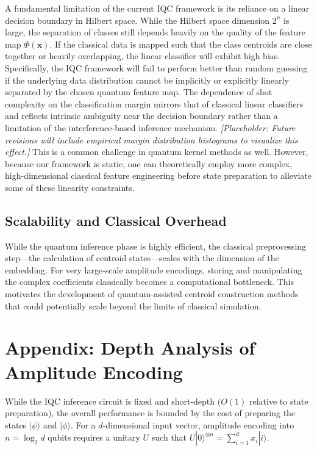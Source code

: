 \documentclass[conference]{IEEEtran}
\begin{document}
A fundamental limitation of the current IQC framework is its reliance on a linear decision boundary in Hilbert space. While the Hilbert space dimension $2^n$ is large, the separation of classes still depends heavily on the quality of the feature map $\Phi(\mathbf{x})$. If the classical data is mapped such that the class centroids are close together or heavily overlapping, the linear classifier will exhibit high bias. Specifically, the IQC framework will fail to perform better than random guessing if the underlying data distribution cannot be implicitly or explicitly linearly separated by the chosen quantum feature map. The dependence of shot complexity on the classification margin mirrors that of classical linear classifiers and reflects intrinsic ambiguity near the decision boundary rather than a limitation of the interference-based inference mechanism. \textit{[Placeholder: Future revisions will include empirical margin distribution histograms to visualize this effect.]} This is a common challenge in quantum kernel methods as well. However, because our framework is static, one can theoretically employ more complex, high-dimensional classical feature engineering before state preparation to alleviate some of these linearity constraints.

\subsection{Scalability and Classical Overhead}

While the quantum inference phase is highly efficient, the classical preprocessing step---the calculation of centroid states---scales with the dimension of the embedding. For very large-scale amplitude encodings, storing and manipulating the complex coefficients classically becomes a computational bottleneck. This motivates the development of quantum-assisted centroid construction methods that could potentially scale beyond the limits of classical simulation.

\section*{Appendix: Depth Analysis of Amplitude Encoding}

While the IQC inference circuit is fixed and short-depth ($O(1)$ relative to state preparation), the overall performance is bounded by the cost of preparing the states $|\psi\rangle$ and $|\phi\rangle$. For a $d$-dimensional input vector, amplitude encoding into $n = \log_2 d$ qubits requires a unitary $U$ such that $U|0\rangle^{\otimes n} = \sum_{i=1}^d x_i |i\rangle$.
\end{document}
